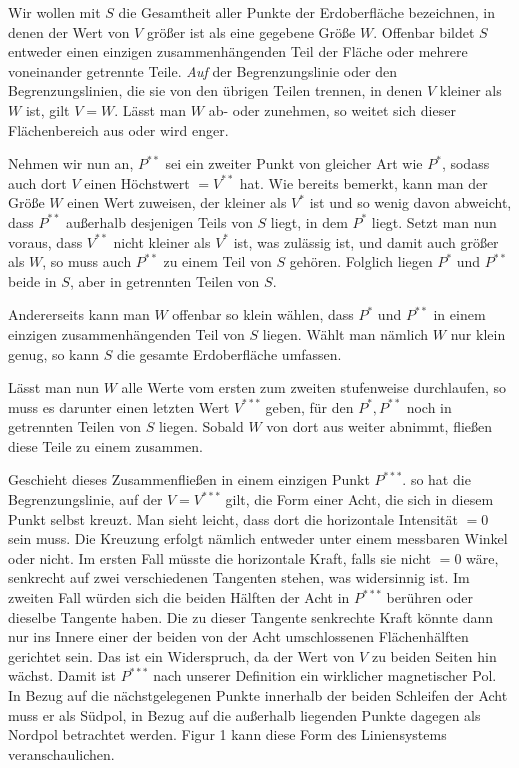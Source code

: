 Wir wollen mit $S$ die Gesamtheit aller Punkte der Erdoberfläche bezeichnen, in denen der Wert von $V$ größer ist als eine gegebene Größe $W$. Offenbar bildet $S$ entweder einen einzigen zusammenhängenden Teil der Fläche oder mehrere voneinander getrennte Teile. \textit{Auf} der Begrenzungslinie oder den Begrenzungslinien, die sie von den übrigen Teilen trennen, in denen $V$ kleiner als $W$ ist, gilt $V=W$. Lässt man $W$ ab- oder zunehmen, so weitet sich dieser Flächenbereich aus oder wird enger.

Nehmen wir nun an, $P^{**}$ sei ein zweiter Punkt von gleicher Art wie $P^*$, sodass auch dort $V$ einen Höchstwert $=V^{**}$ hat. Wie bereits bemerkt, kann man der Größe $W$ einen Wert zuweisen, der kleiner als $V^*$ ist und so wenig davon abweicht, dass $P^{**}$ außerhalb desjenigen Teils von $S$ liegt, in dem $P^*$ liegt. Setzt man nun voraus, dass $V^{**}$ nicht kleiner als $V^*$ ist, was zulässig ist, und damit auch größer als $W$, so muss auch $P^{**}$ zu einem Teil von $S$ gehören. Folglich liegen $P^*$ und $P^{**}$ beide in $S$, aber in getrennten Teilen von $S$.

Andererseits kann man $W$ offenbar so klein wählen, dass $P^*$ und $P^{**}$ in einem einzigen zusammenhängenden Teil von $S$ liegen. Wählt man nämlich $W$ nur klein genug, so kann $S$ die gesamte Erdoberfläche umfassen.

Lässt man nun $W$ alle Werte vom ersten zum zweiten stufenweise durchlaufen, so muss es darunter einen letzten Wert $V^{***}$ geben, für den $P^*,P^{**}$ noch in getrennten Teilen von $S$ liegen. Sobald $W$ von dort aus weiter abnimmt, fließen diese Teile zu einem zusammen.

Geschieht dieses Zusammenfließen in einem einzigen Punkt $P^{***}$. so hat die Begrenzungslinie, auf der $V=V^{***}$ gilt, die Form einer Acht, die sich in diesem Punkt selbst kreuzt. Man sieht leicht, dass dort die horizontale Intensität $=0$ sein muss. Die Kreuzung erfolgt nämlich entweder unter einem messbaren Winkel oder nicht. Im ersten Fall müsste die horizontale Kraft, falls sie nicht $=0$ wäre, senkrecht auf zwei verschiedenen Tangenten stehen, was widersinnig ist. Im zweiten Fall würden sich die beiden Hälften der Acht in $P^{***}$ berühren oder dieselbe Tangente haben. Die zu dieser Tangente senkrechte Kraft könnte dann nur ins Innere einer der beiden von der Acht umschlossenen Flächenhälften gerichtet sein. Das ist ein Widerspruch, da der Wert von $V$ zu beiden Seiten hin wächst. Damit ist $P^{***}$ nach unserer Definition ein wirklicher magnetischer Pol. In Bezug auf die nächstgelegenen Punkte innerhalb der beiden Schleifen der Acht muss er als Südpol, in Bezug auf die außerhalb liegenden Punkte dagegen als Nordpol betrachtet werden. Figur 1 kann diese Form des Liniensystems veranschaulichen.

